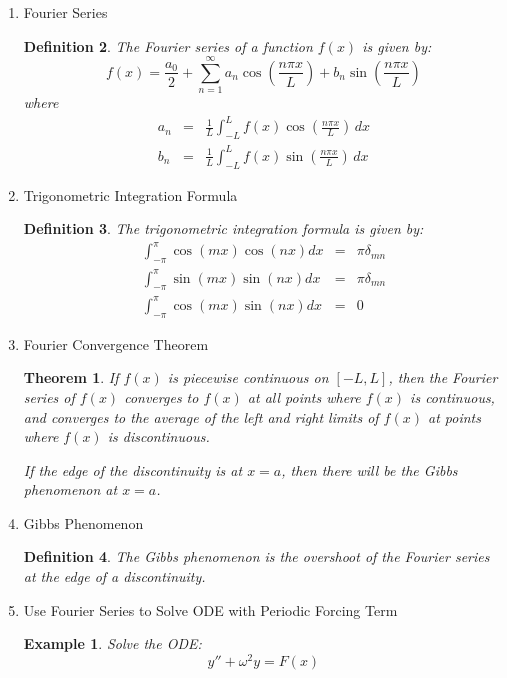 \documentclass{article}
\newtheorem{definition}{Definition}[section]
\newtheorem{theorem}{Theorem}[section]
\newtheorem{example}{Example}[section]
\begin{document}
\begin{enumerate}
\begin{definition}
              As the Bessel equation has a regular singular point at $x = 0$,
              we can solve this equation for two linearly independent series solutions.
          \end{definition}
    \item Fourier Series
          \begin{definition}
              The Fourier series of a function $f(x)$ is given by:
              \begin{equation}
                  f(x) = \frac{a_0}{2} + \sum_{n=1}^{\infty} a_n \cos \left( \frac{n \pi x}{L} \right) + b_n \sin \left( \frac{n \pi x}{L} \right)
              \end{equation}
              where
              \begin{eqnarray}
                  a_n &=& \frac{1}{L} \int_{-L}^{L} f(x) \cos \left( \frac{n \pi x}{L} \right) \, dx \\
                  b_n &=& \frac{1}{L} \int_{-L}^{L} f(x) \sin \left( \frac{n \pi x}{L} \right) \, dx
              \end{eqnarray}
          \end{definition}
    \item Trigonometric Integration Formula
          \begin{definition}
              The trigonometric integration formula is given by:
              \begin{eqnarray}
                  \int_{-\pi}^{\pi} \cos(mx)\cos(nx) dx &=& \pi \delta_{mn} \\
                  \int_{-\pi}^{\pi} \sin(mx)\sin(nx) dx &=& \pi \delta_{mn} \\
                  \int_{-\pi}^{\pi} \cos(mx)\sin(nx) dx &=& 0
              \end{eqnarray}
          \end{definition}
    \item Fourier Convergence Theorem
          \begin{theorem}
              If $f(x)$ is piecewise continuous on $[-L, L]$,
              then the Fourier series of $f(x)$ converges to $f(x)$ at all points where $f(x)$ is continuous,
              and converges to the average of the left and right limits of $f(x)$ at points where $f(x)$ is discontinuous.

              If the edge of the discontinuity is at $x = a$,
              then there will be the Gibbs phenomenon at $x = a$.
          \end{theorem}
    \item Gibbs Phenomenon
          \begin{definition}
              The Gibbs phenomenon is the overshoot of the Fourier series at the edge of a discontinuity.
          \end{definition}
    \item Use Fourier Series to Solve ODE with Periodic Forcing Term
          \begin{example}
              Solve the ODE:
              \begin{equation}
                  y'' + \omega^2 y = F(x)
              \end{equation}


\end{example}
\end{enumerate}
\end{document}

